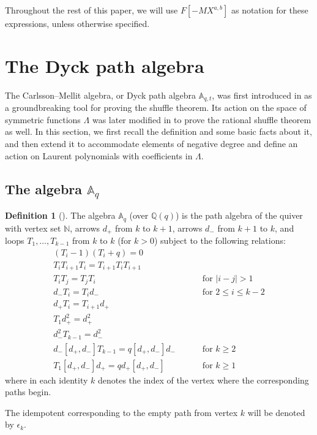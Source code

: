 \documentclass[reqno]{amsart}
\theoremstyle{plain}
\theoremstyle{definition}
\newtheorem{definition}[theorem]{Definition}
\theoremstyle{remark}
\newcommand{\N}{\mathbb{N}}
\newcommand{\Q}{\mathbb{Q}}
\newcommand{\A}{\mathbb{A}}%
\newcommand{\<}{\langle}
\renewcommand{\>}{\rangle}
\begin{document}
Throughout the rest of this paper, we will use $F[-MX^{a,b}]$ as notation for these expressions, unless otherwise specified.

\section{The Dyck path algebra}
\label{sec:Aqt}

The Carlsson--Mellit algebra, or Dyck path algebra $\A_{q,t}$, was first introduced in \cite{CarlssonMellit2018ShuffleConjecture} as a groundbreaking tool for proving the shuffle theorem. Its action on the space of symmetric functions $\Lambda$ was later modified in \cite{Mellit2021Rational} to prove the rational shuffle theorem as well. In this section, we first recall the definition and some basic facts about it, and then extend it to accommodate elements of negative degree and define an action on Laurent polynomials with coefficients in $\Lambda$.

\subsection{The algebra \texorpdfstring{$\A_q$}{Aq}}

\begin{definition}[{\cite[Definition~3.1]{CarlssonMellit2018ShuffleConjecture}}]
    \label{def:Aq}
    The algebra $\A_q$ (over $\Q(q)$) is the path algebra of the quiver with vertex set $\N$, arrows $d_+$ from $k$ to $k+1$, arrows $d_-$ from $k+1$ to $k$, and loops $T_1, \dots, T_{k-1}$ from $k$ to $k$ (for $k > 0$) subject to the following relations:
    \begin{align}
        (T_i-1)(T_i+q) = 0 & \label{eq:skein} \tag{S} \\
        T_i T_{i+1} T_i = T_{i+1} T_i T_{i+1} & \label{eq:braid} \tag{B} \\
        T_i T_j = T_j T_i & \qquad \text{ for } \lvert i-j \rvert > 1 \label{eq:commuting} \tag{C} \\
        d_- T_i = T_i d_- & \qquad \text{ for } 2 \leq i \leq k-2 \label{eq:r1} \tag{R1} \\
        d_+ T_i = T_{i+1} d_+ & \label{eq:r2} \tag{R2} \\
        T_1 d_+^2 = d_+^2 & \label{eq:r3} \tag{R3} \\
        d_-^2T_{k-1} = d_-^2 & \label{eq:r4} \tag{R4} \\
        d_- [d_+,d_-] T_{k-1} = q [d_+,d_-] d_- & \qquad \text{ for } k \geq 2 \label{eq:r5} \tag{R5} \\
        T_1 [d_+,d_-] d_+ = q d_+ [d_+,d_-] & \qquad \text{ for } k \geq 1 \label{eq:r6} \tag{R6}
    \end{align}
    where in each identity $k$ denotes the index of the vertex where the corresponding paths begin.
    
    The idempotent corresponding to the empty path from vertex $k$ will be denoted by $\epsilon_k$.
\end{definition}
\end{document}
